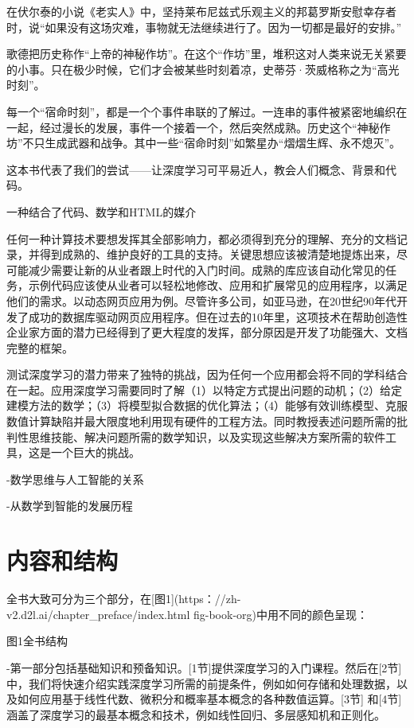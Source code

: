 在伏尔泰的小说《老实人》中，坚持莱布尼兹式乐观主义的邦葛罗斯安慰幸存者时，说“如果没有这场灾难，事物就无法继续进行了。因为一切都是最好的安排。”

歌德把历史称作“上帝的神秘作坊”。在这个“作坊”里，堆积这对人类来说无关紧要的小事。只在极少时候，它们才会被某些时刻着凉，史蒂芬·茨威格称之为“高光时刻”。

每一个“宿命时刻”，都是一个个事件串联的了解过。一连串的事件被紧密地编织在一起，经过漫长的发展，事件一个接着一个，然后突然成熟。历史这个“神秘作坊”不只生成武器和战争。其中一些“宿命时刻”如繁星办“熠熠生辉、永不熄灭”。

这本书代表了我们的尝试——让深度学习可平易近人，教会人们概念、背景和代码。

一种结合了代码、数学和HTML的媒介

任何一种计算技术要想发挥其全部影响力，都必须得到充分的理解、充分的文档记录，并得到成熟的、维护良好的工具的支持。关键思想应该被清楚地提炼出来，尽可能减少需要让新的从业者跟上时代的入门时间。成熟的库应该自动化常见的任务，示例代码应该使从业者可以轻松地修改、应用和扩展常见的应用程序，以满足他们的需求。以动态网页应用为例。尽管许多公司，如亚马逊，在20世纪90年代开发了成功的数据库驱动网页应用程序。但在过去的10年里，这项技术在帮助创造性企业家方面的潜力已经得到了更大程度的发挥，部分原因是开发了功能强大、文档完整的框架。

测试深度学习的潜力带来了独特的挑战，因为任何一个应用都会将不同的学科结合在一起。应用深度学习需要同时了解（1）以特定方式提出问题的动机；（2）给定建模方法的数学；（3）将模型拟合数据的优化算法；（4）能够有效训练模型、克服数值计算缺陷并最大限度地利用现有硬件的工程方法。同时教授表述问题所需的批判性思维技能、解决问题所需的数学知识，以及实现这些解决方案所需的软件工具，这是一个巨大的挑战。


-数学思维与人工智能的关系

-从数学到智能的发展历程

\section{内容和结构}

全书大致可分为三个部分，在[图1](https：//zh-v2.d2l.ai/chapter\_preface/index.html fig-book-org)中用不同的颜色呈现：


图1全书结构

-第一部分包括基础知识和预备知识。[1节]提供深度学习的入门课程。然后在[2节]中，我们将快速介绍实践深度学习所需的前提条件，例如如何存储和处理数据，以及如何应用基于线性代数、微积分和概率基本概念的各种数值运算。[3节] 和[4节]涵盖了深度学习的最基本概念和技术，例如线性回归、多层感知机和正则化。

